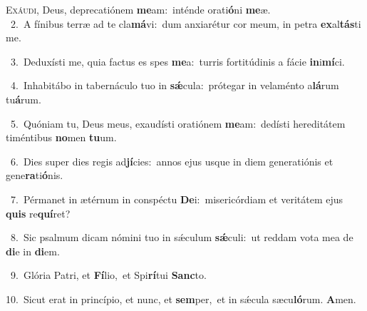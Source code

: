 \lettrine{\initial\textcolor{\initialcolor}{E}}{xáudi,} Deus, deprecatiónem \textbf{me}\-am:~\star inténde orati\-\textbf{ó}\-ni \textbf{me}\-æ.\\
{\numbfont\textcolor{\numbcolor}{~2.}}~A fínibus terræ ad te cla\-\textbf{má}\-vi:~\star dum anxiarétur cor meum, in petra \textbf{ex}\-al\-\textbf{tás}\-ti me.\par
{\numbfont\textcolor{\numbcolor}{~3.}}~Deduxísti me, quia factus es spes \textbf{me}\-a:~\star turris fortitúdinis a fácie \textbf{in}\-i\-\textbf{mí}\-ci.\par
{\numbfont\textcolor{\numbcolor}{~4.}}~Inhabitábo in tabernáculo tuo in \textbf{sǽ}\-cula:~\star prótegar in velaménto a\-\textbf{lá}\-rum tu\-\textbf{á}\-rum.\par
{\numbfont\textcolor{\numbcolor}{~5.}}~Quóniam tu, Deus meus, exaudísti oratiónem \textbf{me}\-am:~\star dedísti hereditátem timéntibus \textbf{no}\-men \textbf{tu}\-um.\par
{\numbfont\textcolor{\numbcolor}{~6.}}~Dies super dies regis ad\-\textbf{jí}\-cies:~\star annos ejus usque in diem generatiónis et gene\-\textbf{ra}\-ti\-\textbf{ó}\-nis.\par
{\numbfont\textcolor{\numbcolor}{~7.}}~Pérmanet in ætérnum in conspéctu \textbf{De}\-i:~\star misericórdiam et veritátem ejus \textbf{quis} re\-\textbf{quí}\-ret?\par
{\numbfont\textcolor{\numbcolor}{~8.}}~Sic psalmum dicam nómini tuo in sǽculum \textbf{sǽ}\-culi:~\star ut reddam vota mea de \textbf{di}\-e in \textbf{di}\-em.\par
{\numbfont\textcolor{\numbcolor}{~9.}}~Glória Patri, et \textbf{Fí}\-lio,~\star et Spi\-\textbf{rí}\-tui \textbf{Sanc}\-to.\par
{\numbfont\textcolor{\numbcolor}{10.}}~Sicut erat in princípio, et nunc, et \textbf{sem}\-per,~\star et in sǽcula sæcu\-\textbf{ló}\-rum. \textbf{A}\-men.\par

